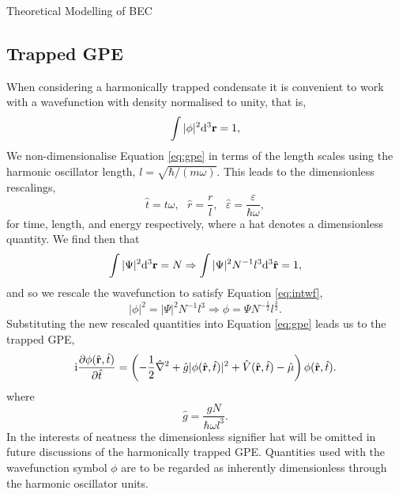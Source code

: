 \begin{chapter}{\label{cha:theoretical_model}Theoretical Modelling of BEC}
	\subsection{\label{section:gpedimlesstrap} Trapped GPE}
		When considering a harmonically trapped condensate it is convenient to work with a wavefunction with density normalised to unity, that is,
		\begin{equation}\label{eq:intwf}
			\int |\phi|^2 \mathrm{d}^3{\bf r} = 1,
		\end{equation}
		We non-dimensionalise Equation \ref{eq:gpe} in terms of the length scales using the harmonic oscillator length, $l = \sqrt{\hbar/(m\omega)}$. This leads to the dimensionless rescalings,
		\begin{equation}
			\hat{t} = t\omega, ~~~ \hat{r} = \frac{r}{l}, ~~~ \hat{\varepsilon}= \frac{\varepsilon}{\hbar\omega},
		\end{equation}
		for time, length, and energy respectively, where a hat denotes a dimensionless quantity.
		We find then that
		\begin{equation}
			\int |\Psi|^2 \mathrm{d}^3{\bf r} = N \Rightarrow \int |\Psi|^2 N^{-1} l^3\mathrm{d}^3\hat{\bf r} = 1,
		\end{equation}
		and so we rescale the wavefunction to satisfy Equation \ref{eq:intwf},
		\begin{equation}
			 |\phi|^2 = |\Psi|^2 N^{-1} l^3 \Rightarrow \phi = \Psi N^{-\frac{1}{2}} l^\frac{3}{2}.
		\end{equation}
	Substituting the new rescaled quantities into Equation \ref{eq:gpe} leads us to the trapped GPE,
	\begin{equation}\label{eq:dimgpetrapped}
		\mathrm{i}\frac{\partial\phi({\hat{\bf r}},\hat{t})}{\partial {\hat{t}}} = \left( -\frac{1}{2}\hat{\nabla}^2 + \hat{g}|\phi({\hat{\bf r}},\hat{t})|^2 + \hat{V}({\hat{\bf r}},\hat{t}) - \hat{\mu} \right) \phi({\hat{\bf r}},\hat{t}).
	\end{equation}
	where
	\begin{equation}
		 \hat{g} = \frac{gN}{\hbar \omega l^3}.
	\end{equation}
	In the interests of neatness the dimensionless signifier hat will be omitted in future discussions of the harmonically trapped GPE. Quantities used with the wavefunction symbol $\phi$ are to be regarded as inherently dimensionless through the harmonic oscillator units.


\end{chapter}

